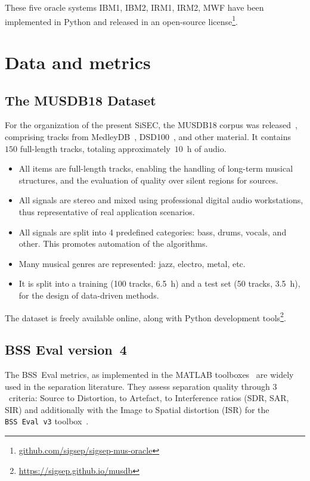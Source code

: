 \documentclass{llncs}
\begin{document}
These five oracle systems IBM1, IBM2, IRM1, IRM2, MWF have been implemented in Python and released in an open-source license\footnote{\url{github.com/sigsep/sigsep-mus-oracle}}.

\section{Data and metrics}

\subsection{The MUSDB18 Dataset}
For the organization of the present SiSEC, the MUSDB18 corpus was released~\cite{musdb18}, comprising tracks from MedleyDB~\cite{medleydb}, DSD100~\cite{sisec2015,sisec2016}, and other material. It contains $150$ full-length tracks, totaling approximately~$10$~h of audio.
\begin{itemize}
\item All items are full-length tracks, enabling the handling of long-term musical structures, and the evaluation of quality over silent regions for sources.
\item All signals are stereo and mixed using professional digital audio workstations, thus representative of real application scenarios.
\item All signals are split into 4 predefined categories: bass, drums, vocals, and other. This promotes automation of the algorithms.
\item Many musical genres are represented: jazz, electro, metal, etc.
\item It is split into a training (100 tracks, 6.5~h) and a test set (50 tracks, 3.5~h), for the design of data-driven methods.
\end{itemize}
The dataset is freely available online, along with Python development tools\footnote{\url{https://sigsep.github.io/musdb}}.

\subsection{BSS Eval version~4}
\label{ssec:bssevalv4}

The BSS~Eval metrics, as implemented in the MATLAB toolboxes~\cite{bssevalv2,bssevalv3} are widely used in the separation literature. They assess separation quality  through $3$~criteria: Source to Distortion, to Artefact, to Interference ratios (SDR, SAR, SIR) and additionally with the Image to Spatial distortion (ISR) for the \texttt{BSS~Eval v3} toolbox~\cite{bssevalv3}.
\end{document}
